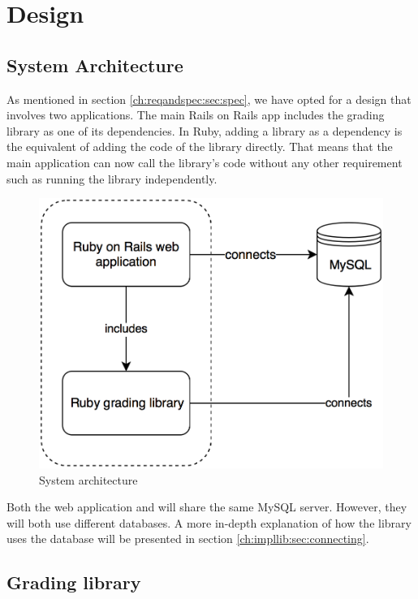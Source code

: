\chapter{Design}

\section{System Architecture}

As mentioned in section \ref{ch:reqandspec:sec:spec}, we have opted for a design that involves two applications. The main Rails on Rails app includes the grading library as one of its dependencies. In Ruby, adding a library as a dependency is the equivalent of adding the code of the library directly. That means that the main application can now call the library's code without any other requirement such as running the library independently.

\begin{figure}[H]
    \centering
    \includegraphics[width=(\linewidth / 2)]{Chapters/4-Design/sysarh.png}
    \caption{System architecture}
\end{figure}

Both the web application and will share the same MySQL server. However, they will both use different databases. A more in-depth explanation of how the library uses the database will be presented in section \ref{ch:impllib:sec:connecting}.

\section{Grading library}

